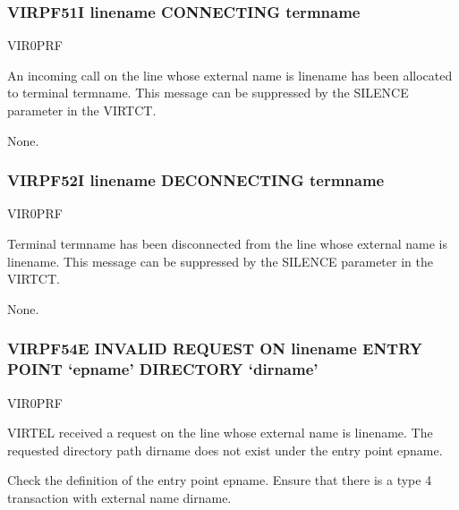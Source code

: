 \documentclass[letterpaper,10pt,english]{sphinxmanual}
\begin{document}
\subsubsection{VIRPF51I linename CONNECTING termname}
\label{\detokenize{messages:virpf51i-linename-connecting-termname}}\begin{description}
\sphinxAtStartPar
VIR0PRF

\sphinxAtStartPar
An incoming call on the line whose external name is linename has been allocated to terminal termname. This message can be suppressed by the SILENCE parameter in the VIRTCT.

\sphinxAtStartPar
None.

\end{description}


\subsubsection{VIRPF52I linename DECONNECTING termname}
\label{\detokenize{messages:virpf52i-linename-deconnecting-termname}}\begin{description}
\sphinxAtStartPar
VIR0PRF

\sphinxAtStartPar
Terminal termname has been disconnected from the line whose external name is linename. This message can be suppressed by the SILENCE parameter in the VIRTCT.

\sphinxAtStartPar
None.

\end{description}


\subsubsection{VIRPF54E INVALID REQUEST ON linename ENTRY POINT ‘epname’ DIRECTORY ‘dirname’}
\label{\detokenize{messages:virpf54e-invalid-request-on-linename-entry-point-epname-directory-dirname}}\begin{description}
\sphinxAtStartPar
VIR0PRF

\sphinxAtStartPar
VIRTEL received a request on the line whose external name is linename. The requested directory path dirname does not exist under the entry point epname.

\sphinxAtStartPar
Check the definition of the entry point epname. Ensure that there is a type 4 transaction with external name dirname.

\end{description}
\end{document}
